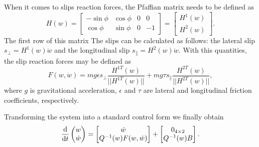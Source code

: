 When it comes to slips reaction forces, the Pfaffian matrix needs to be defined as
\begin{equation}
H(w)=\begin{bmatrix}
-\sin\phi & \cos\phi & 0 & 0\\
\cos\phi & \sin\phi & 0 & -1
\end{bmatrix}=\begin{bmatrix}
H^1(w)\\
H^2(w)
\end{bmatrix}.
\end{equation}
The first row of this matrix 
The slips can be calculated as follows: the lateral slip $s_\perp=H^1(w)\dot w$ and the longitudinal slip $s_\parallel=H^2(w)\dot w$. With this quantities, the slip reaction forces may be defined as 
\begin{equation}
F(w, \dot w)=mg\epsilon s_\perp\frac{H^{1T}(w)}{||H^{1T}(w)||} + mg\tau s_\parallel\frac{H^{2T}(w)}{||H^{2T}(w)||},
\end{equation}
where $g$ is gravitational acceleration, $\epsilon$ and $\tau$ are lateral and longitudinal friction coefficients, respectively.

Transforming the system into a standard control form we finally obtain
\begin{equation}
\frac{\mathrm{d}}{\mathrm{d} t}\begin{pmatrix}
w \\ \dot w
\end{pmatrix}
 = 
 \begin{bmatrix}
 \dot w \\ Q^{-1}(w)F(w, \dot w)
 \end{bmatrix}+\begin{bmatrix}
 0_{4\times 2} \\ Q^{-1}(w)B
 \end{bmatrix}.
\end{equation}
